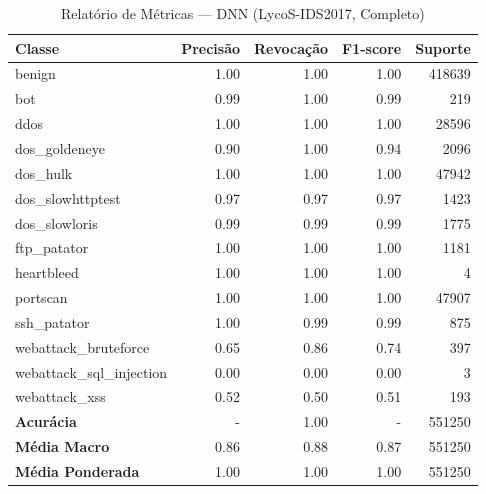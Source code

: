 \begin{table}[H]
    \centering
    \small
    \begin{tabular}{lrrrr}
        \hline
        Classe                    & Precisão & Revocação & F1-score & Suporte \\
        \hline
        benign                    & 1.00     & 1.00      & 1.00     & 418639  \\
        bot                       & 0.99     & 1.00      & 0.99     & 219     \\
        ddos                      & 1.00     & 1.00      & 1.00     & 28596   \\
        dos\_goldeneye            & 0.90     & 1.00      & 0.94     & 2096    \\
        dos\_hulk                 & 1.00     & 1.00      & 1.00     & 47942   \\
        dos\_slowhttptest         & 0.97     & 0.97      & 0.97     & 1423    \\
        dos\_slowloris            & 0.99     & 0.99      & 0.99     & 1775    \\
        ftp\_patator              & 1.00     & 1.00      & 1.00     & 1181    \\
        heartbleed                & 1.00     & 1.00      & 1.00     & 4       \\
        portscan                  & 1.00     & 1.00      & 1.00     & 47907   \\
        ssh\_patator              & 1.00     & 0.99      & 0.99     & 875     \\
        webattack\_bruteforce     & 0.65     & 0.86      & 0.74     & 397     \\
        webattack\_sql\_injection & 0.00     & 0.00      & 0.00     & 3       \\
        webattack\_xss            & 0.52     & 0.50      & 0.51     & 193     \\
        \hline
        \textbf{Acurácia}         & -        & 1.00      & -        & 551250  \\
        \textbf{Média Macro}      & 0.86     & 0.88      & 0.87     & 551250  \\
        \textbf{Média Ponderada}  & 1.00     & 1.00      & 1.00     & 551250  \\
        \hline
    \end{tabular}
    \caption{Relatório de Métricas — DNN (LycoS-IDS2017, Completo)}
    \label{table:dnn_lycos_completo_metricas}
\end{table}
